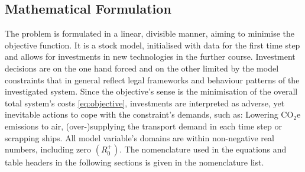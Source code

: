 \documentclass[article]{elsarticle}
\begin{document}
\subsection{Mathematical Formulation}
\label{subsec:Mat}
The problem is formulated in a linear, divisible manner, aiming to minimise the objective function. It is a stock model, initialised with data for the first time step and allows for investments in new technologies in the further course. Investment decisions are on the one hand forced and on the other limited by the model constraints that in general reflect legal frameworks and behaviour patterns of the investigated system. Since the objective's sense is the minimisation of the overall total system's costs \cref{eq:objective}, investments are interpreted as adverse, yet inevitable actions to cope with the constraint's demands, such as: Lowering CO$_2$e emissions to air, (over-)supplying the transport demand in each time step or scrapping ships. All model variable's domains are within non-negative real numbers, including zero $\left(R_{0}^{+}\right)$. The nomenclature used in the equations and table headers in the following sections is given in the nomenclature list.
\glsdisablehyper
\glsaddall
\begin{table}[thb] 
\renewcommand\tablename{Nomenclature list}
\begin{mdframed}
\footnotesize{
\begin{multicols}{2}
\printglossary[style=tree,type=a]
\vspace{-0.3cm}
\printglossary[style=tree,type=s]
\vspace{-0.3cm}
\printglossary[style=tree,type=v]
\vspace{-0.3cm}
\printglossary[style=tree,type=p]
\end{multicols}
}
\end{mdframed}
\caption{}
\end{table}
\end{document}
